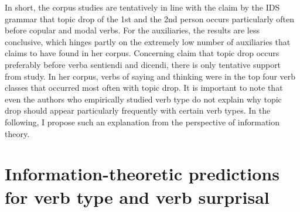 In short, the corpus studies are tentatively in line with the claim by the IDS grammar \citep{zifonun.etal1997} that topic drop of the 1st and the 2nd person occurs particularly often before copular and modal verbs.
For the auxiliaries, the results are less conclusive, which hinges partly on the extremely low number of auxiliaries that \citet{frick2017} claims to have found in her corpus.
Concerning  claim that topic drop occurs preferably before verba sentiendi and dicendi, there is only tentative support from  study.
In her corpus, verbs of saying and thinking were in the top four verb classes that occurred most often with topic drop.
It is important to note that even the authors who empirically studied verb type do not explain why topic drop should appear particularly frequently with certain verb types.
In the following, I propose such an explanation from the perspective of information theory.
   

\section{Information-theoretic predictions for verb type and verb surprisal}\label{sec:verb.info.theory.predictions}
\largerpage[2]

